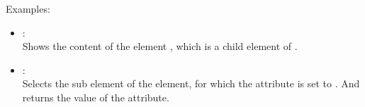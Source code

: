Examples:

\begin{itemize}

\item
{}:\\
Shows the content of the element , which is a child element of .

\item
{}:\\
Selects the  sub element of the  element, for
which the  attribute is set to . And returns the value of the
 attribute.

\end{itemize}